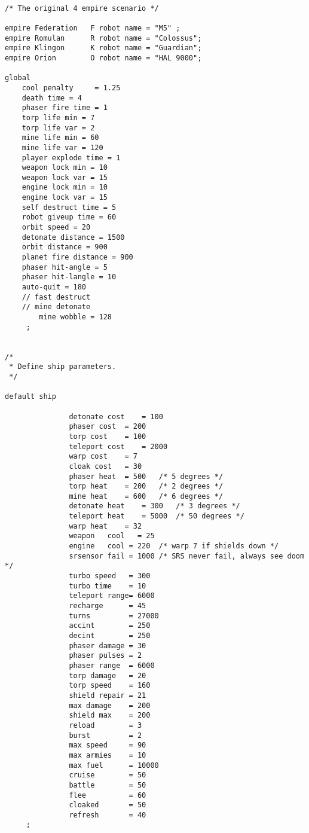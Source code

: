 \begin{verbatim}

/* The original 4 empire scenario */ 

empire Federation 	F robot name = "M5"	;
empire Romulan 		R robot name = "Colossus";
empire Klingon    	K robot name = "Guardian";
empire Orion 		O robot name = "HAL 9000";

global
	cool penalty     = 1.25
	death time = 4
	phaser fire time = 1
	torp life min = 7
	torp life var = 2
	mine life min = 60
	mine life var = 120
	player explode time = 1
	weapon lock min = 10
	weapon lock var = 15
	engine lock min = 10
	engine lock var = 15
	self destruct time = 5
	robot giveup time = 60
	orbit speed = 20
	detonate distance = 1500
	orbit distance = 900
	planet fire distance = 900
	phaser hit-angle = 5
	phaser hit-langle = 10
	auto-quit = 180
	// fast destruct  
	// mine detonate 
        mine wobble = 128
     ;


/*
 * Define ship parameters.
 */

default ship

               detonate cost 	= 100
               phaser cost 	= 200
               torp cost 	= 100
               teleport cost 	= 2000
               warp cost 	= 7
               cloak cost 	= 30
               phaser heat 	= 500	/* 5 degrees */
               torp heat 	= 200	/* 2 degrees */
               mine heat 	= 600	/* 6 degrees */
               detonate heat 	= 300	/* 3 degrees */
               teleport heat 	= 5000	/* 50 degrees */
               warp heat 	= 32
               weapon 	cool   = 25
               engine   cool = 220	/* warp 7 if shields down */
               srsensor fail = 1000	/* SRS never fail, always see doom */
               turbo speed   = 300
               turbo time    = 10
               teleport range= 6000
               recharge      = 45
               turns         = 27000
               accint        = 250
               decint        = 250
               phaser damage = 30
               phaser pulses = 2
               phaser range  = 6000
               torp damage   = 20
               torp speed    = 160
               shield repair = 21
               max damage    = 200
               shield max    = 200
               reload        = 3
               burst         = 2
               max speed     = 90
               max armies    = 10
               max fuel      = 10000
               cruise        = 50
               battle        = 50
               flee          = 60
               cloaked       = 50
               refresh       = 40
     ;


\end{verbatim}
